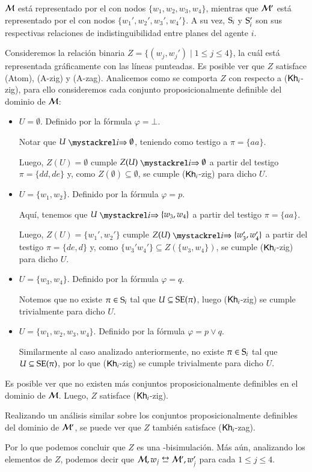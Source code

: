 \begin{ejemplo}
    $\modults$ está representado por el \ults con nodos $\{w_1,w_2,w_3,w_4\}$, mientras que $\modults'$ está representado 
    por el \ults con nodos $\{w_1',w_2',w_3',w_4'\}$. A su vez, $\S_i$ y $\S'_i$ son sus respectivas relaciones de indistinguibilidad 
    entre planes del agente $i$.

    Consideremos la relación binaria $Z = \{(w_j, w_j') \mid 1 \leq j \leq 4\}$, la cuál está representada gráficamente con las líneas 
    punteadas. Es posible ver que $Z$ satisface (Atom), (A-zig) y (A-zag). Analicemos como se comporta $Z$ con respecto a ($\khi$-zig), para ello 
    consideremos cada conjunto proposicionalmente definible del dominio de $\modults$:
    \begin{itemize}
       \item $U = \emptyset$. Definido por la fórmula $\varphi = \bot$.

       Notar que $U \ultsExecAgi \emptyset$, teniendo como testigo a $\pi = \{aa\}$.

       Luego, $Z(U) = \emptyset$ cumple $Z(U) \ultsExecAgi \emptyset$ a partir del testigo $\pi = \{dd,de\}$ y, 
       como $Z(\emptyset) \subseteq \emptyset$, se cumple ($\khi$-zig) para dicho $U$.
       \item $U = \{w_1,w_2\}$. Definido por la fórmula $\varphi = p$.
       
       Aquí, tenemos que $U \ultsExecAgi \{w_3,w_4\}$ a partir del testigo $\pi = \{aa\}$.

       Luego, $Z(U) = \{w_1',w_2'\}$ cumple $Z(U) \ultsExecAgi \{w_3',w_4'\}$ a partir del testigo $\pi = \{de,d\}$ y, 
       como $\{w_3'w_4'\} \subseteq Z(\{w_3,w_4\})$, se cumple ($\khi$-zig) para dicho $U$.
       \item $U = \{w_3,w_4\}$. Definido por la fórmula $\varphi = q$.
       
       Notemos que no existe $\pi \in \S_i$ tal que $U \subseteq \sexec(\pi)$, luego ($\khi$-zig) se cumple trivialmente para dicho $U$.
       \item $U = \{w_1,w_2,w_3,w_4\}$. Definido por la fórmula $\varphi = p \vee q$. 
       
       Similarmente al caso analizado anteriormente, no existe $\pi \in \S_i$ tal que $U \subseteq \sexec(\pi)$, por lo que ($\khi$-zig) se 
       cumple trivialmente para dicho $U$.
    \end{itemize}
    Es posible ver que no existen más conjuntos proposicionalmente definibles en el dominio de $\modults$. Luego, $Z$ satisface ($\khi$-zig).
    
    Realizando un análisis similar sobre los conjuntos proposicionalmente definibles del dominio de $\modults'$, se puede ver que $Z$ también 
    satisface ($\khi$-zag).
    
    Por lo que podemos concluir que $Z$ es una \KHilogic-bisimulación. Más aún, analizando los elementos de $Z$, podemos decir que 
    $\modults,w_j \bisim \modults',w_j'$ para cada $1 \leq j \leq 4$. 
\end{ejemplo}


